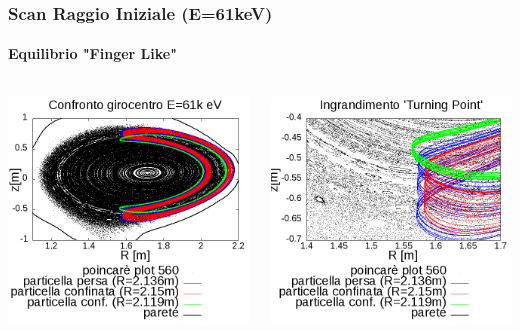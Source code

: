 \begin{frame}
\frametitle{Scan Raggio Iniziale (E=61keV)}
\framesubtitle{Equilibrio "Finger Like"}
\begin{columns}
	\begin{column}{0.4\textwidth}
		\begin{center}
		\includegraphics[scale=0.28]{Immagini/Simulazioni/Single/560/confronto.png}
		\end{center}
	\end{column}
	\begin{column}{0.4\textwidth}
		\begin{center}
		\includegraphics[scale=0.28]{Immagini/Simulazioni/Single/560/confronto_zoom.png}
		\end{center}
	\end{column}
\end{columns}
\end{frame}

